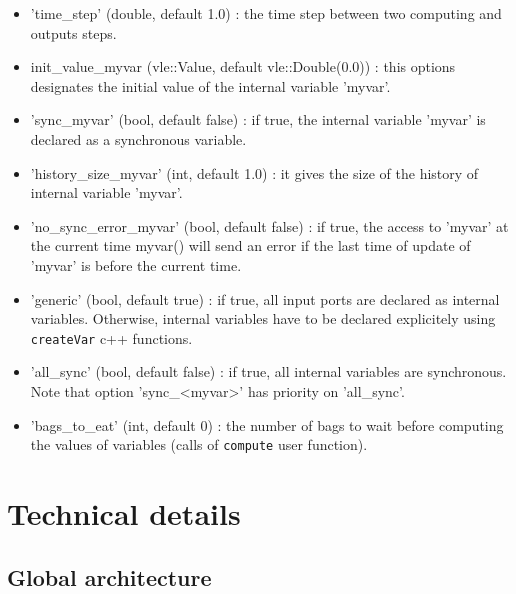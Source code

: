 \documentclass{article}
\theoremstyle{remark}
\begin{document}
\begin{itemize}
  \item 'time\_step' (double, default 1.0) : the time step between two
  computing and outputs steps.
  \item init\_value\_myvar (vle::Value, default vle::Double(0.0)) :
  this options designates the initial value of the internal variable 'myvar'.
  \item 'sync\_myvar' (bool, default false) : if true, the internal variable
  'myvar' is declared as a synchronous variable.
  \item 'history\_size\_myvar' (int, default 1.0) : it gives the size of the
  history of internal variable 'myvar'. 
  \item 'no\_sync\_error\_myvar' (bool, default false) : if true, the access to
  'myvar' at the current time  myvar() will send an error if the last
  time of update of 'myvar' is before the current time.
  \item 'generic' (bool, default true) : if true, all input ports are
  declared as internal variables. Otherwise, internal variables have to be
  declared explicitely using {\tt createVar} c++ functions.
  \item 'all\_sync' (bool, default false) : if true, all internal variables 
  are synchronous. Note that option 'sync\_<myvar>' has priority on 'all\_sync'.
  \item 'bags\_to\_eat' (int, default 0) : the number of bags to wait before
  computing the values of variables (calls of {\tt compute} user function).
\end{itemize} 

\section{Technical details}

\subsection{Global architecture}
\label{sec:archi}
\end{document}
